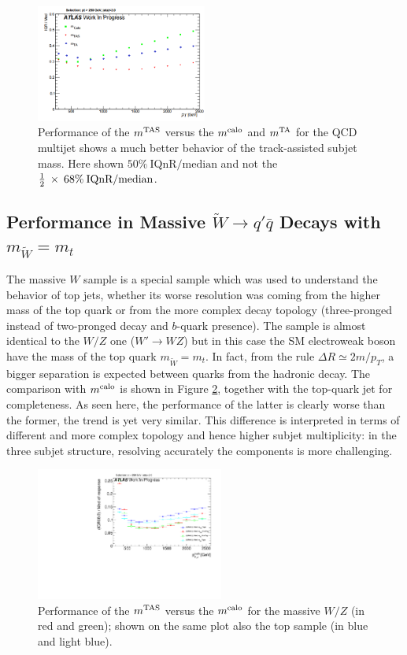 \begin{figure}[!ht]
  \centering
        \includegraphics[width=0.50\textwidth]{jet_part/mtas/qcdmtastruffa.png}
   \caption[$\mtas$ for QCD jets]{Performance of the $\mtas$ versus the $m^\textrm{calo}$ and $m^\textrm{TA}$ for the QCD multijet shows a much better behavior of the track-assisted subjet mass. Here shown $50\% \:\textrm{IQnR/median}$ and not the $\frac{1}{2}\: \times\: 68\% \:\textrm{IQnR/median}$.}
  \label{fig:mtas5}
\end{figure}

\subsection{Performance in Massive $\tilde{W}\to q'\bar{q}$ Decays with $m_{\tilde{W}}=m_t$}
The massive $W$ sample is a special sample which was used to understand the behavior of top jets, whether its worse resolution was coming from the higher mass of the top quark or from the more complex decay topology (three-pronged instead of two-pronged decay and $b$-quark presence). 
The sample is almost identical to the $W/Z$ one ($W'\to WZ$) but in this case the SM electroweak boson have the mass of the top quark $m_{\tilde{W}}=m_t$.
In fact, from the rule $\Delta R\simeq 2m/p_T$, a bigger separation is expected between quarks from the hadronic decay.
The comparison with $m^\textrm{calo}$ is shown in Figure \ref{fig:mtas6}, together with the top-quark jet for completeness. As seen here, the performance of the latter is clearly worse than the former, the trend is yet very similar. This difference is interpreted in terms of different and more complex topology and hence higher subjet multiplicity: in the three subjet structure, resolving accurately the components is more challenging.

\begin{figure}[!ht]
  \centering
     \includegraphics[width=0.55\textwidth]{jet_part/mtas/71graphcftr_h_JetRatio_mJ12CALOIQRoMcalib_WmassiveVsTops.pdf}
   \caption[$\mtas$ for massive $W/Z$]{Performance of the $\mtas$ versus the $m^\textrm{calo}$ for the massive $W/Z$ (in red and green); shown on the same plot also the top sample (in blue and light blue).}
  \label{fig:mtas6}
\end{figure}


